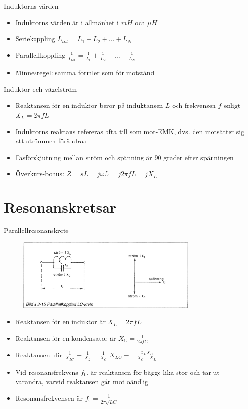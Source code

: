 \documentclass{beamer}
\begin{document}
\begin{frame}{Induktorns värden}
  \begin{itemize}
    \item Induktorns värden är i allmänhet i $mH$ och $\mu H$
    \item Seriekoppling $L_{tot} = L_1 + L_2 + \ldots + L_N$
    \item Parallellkoppling $\frac{1}{L_{tot}} = \frac{1}{L_1} + \frac{1}{L_2} + \ldots + \frac{1}{L_N}$
    \item Minnesregel: samma formler som för motstånd
  \end{itemize}
\end{frame}

\begin{frame}{Induktor och växelström}
  \begin{itemize}
  \item Reaktansen för en induktor beror på induktansen $L$ och frekvensen $f$ enligt $X_L = 2\pi f L$
  \item Induktorns reaktans refereras ofta till som mot-EMK, dvs. den motsätter sig att strömmen förändras
  \item Fasförskjutning mellan ström och spänning är 90 grader efter spänningen
  \item Överkurs-bonus: $Z = sL = j\omega L = j2\pi f L = jX_L$ 
  \end{itemize}
\end{frame}

\section{Resonanskretsar}

\begin{frame}{Parallellresonanskrets}

\begin{figure}[h]
\includegraphics[width=0.8\textwidth]{images/bild_2_3-15}
\end{figure}

\begin{itemize}
  \item Reaktansen för en induktor är $X_L = 2\pi f L$
  \item Reaktansen för en kondensator är $X_C = \frac{1}{2\pi f C}$
  \item Reaktansen blir $\frac{1}{X_{LC}} = \frac{1}{X_L} - \frac{1}{X_C}$ $X_{LC}=-\frac{X_LX_C}{X_C-X_L}$
  \item Vid resonansfrekvens $f_0$, är reaktansen för bägge lika stor och tar ut varandra, varvid reaktansen går mot oändlig
  \item Resonansfrekvensen är $f_0 = \frac{1}{2\pi\sqrt{LC}}$
  \end{itemize}
\end{frame}
\end{document}
